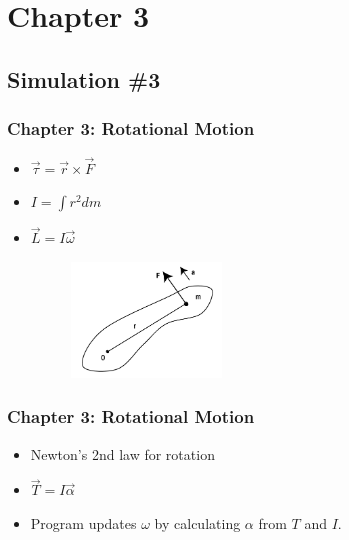 \documentclass{beamer}
\begin{document}
\section{Chapter 3}
\subsection{Simulation \#3}

\begin{frame}

\frametitle{Chapter 3: Rotational Motion}

\begin{itemize}

\item $
\vec{\tau} = \vec{r} \times \vec{F}
$

\item $
I =   \int  r^2 dm
$

\item $
\vec{L} = I \vec{\omega}
$






\begin{figure}[h] 
	\centering
		\includegraphics[width=4cm]{rigidbody.png}

	\label{fig:rigidbody}
\end{figure}

\end{itemize}

\end{frame}





\begin{frame}
\frametitle{Chapter 3: Rotational Motion}

\begin{itemize}

\item Newton's 2nd law for rotation

\item $
\vec{T} = I \vec{\alpha}
$


\vspace{1cm}

\item Program updates $\omega$ by calculating $\alpha$ from $T$ and $I$.
\end{itemize}
\end{frame}
\end{document}

